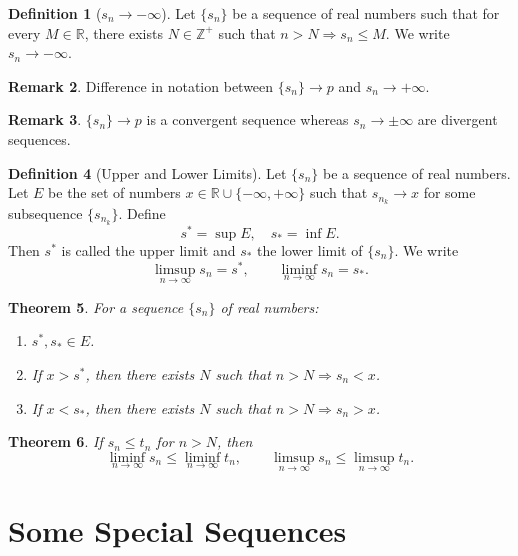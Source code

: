 \documentclass[11pt]{book}
\theoremstyle{definition}
\newtheorem{definition}{Definition}[chapter]
\newtheorem{remark}[definition]{Remark}
\theoremstyle{plain}
\newtheorem{theorem}[definition]{Theorem}
\newcommand{\R}{\mathbb{R}}
\newcommand{\Z}{\mathbb{Z}}
\begin{document}
\begin{definition}[$s_n \to -\infty$]
Let $\{s_n\}$ be a sequence of real numbers such that for every $M \in \R$, there exists
$N \in \Z^+$ such that $n > N \Rightarrow s_n \le M$.
We write $s_n \to -\infty$.
\end{definition}

\begin{remark}
Difference in notation between $\{s_n\} \to p$ and $s_n \to +\infty$.
\end{remark}

\begin{remark}
$\{s_n\} \to p$ is a convergent sequence whereas $s_n \to \pm\infty$ are divergent sequences.
\end{remark}

\begin{definition}[Upper and Lower Limits]
Let $\{s_n\}$ be a sequence of real numbers. Let $E$ be the set of numbers
$x \in \R \cup \{-\infty,+\infty\}$ such that $s_{n_k} \to x$ for some subsequence $\{s_{n_k}\}$.
Define
\[
s^* = \sup E, \quad s_* = \inf E.
\]
Then $s^*$ is called the upper limit and $s_*$ the lower limit of $\{s_n\}$.
We write
\[
\limsup_{n\to\infty} s_n = s^*, \qquad
\liminf_{n\to\infty} s_n = s_*.
\]
\end{definition}

\begin{theorem}
For a sequence $\{s_n\}$ of real numbers:
\begin{enumerate}
\item $s^*, s_* \in E$.
\item If $x > s^*$, then there exists $N$ such that $n > N \Rightarrow s_n < x$.
\item If $x < s_*$, then there exists $N$ such that $n > N \Rightarrow s_n > x$.
\end{enumerate}
\end{theorem}

\begin{theorem}
If $s_n \le t_n$ for $n > N$, then
\[
\liminf_{n\to\infty} s_n \le \liminf_{n\to\infty} t_n,
\qquad
\limsup_{n\to\infty} s_n \le \limsup_{n\to\infty} t_n.
\]
\end{theorem}

\section{Some Special Sequences}
\end{document}

